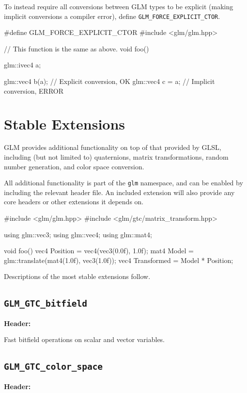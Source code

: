 \documentclass{scrartcl}
\numberwithin{figure}{subsection}
\begin{document}
To instead require all conversions between GLM types to be explicit (making implicit conversions a compiler error), define \verb|GLM_FORCE_EXPLICIT_CTOR|.

\begin{cppcode}
#define GLM_FORCE_EXPLICIT_CTOR
#include <glm/glm.hpp>

// This function is the same as above.
void foo()
{
  glm::ivec4 a;

  glm::vec4 b(a); // Explicit conversion, OK
  glm::vec4 c = a; // Implicit conversion, ERROR
}
\end{cppcode}

\section{Stable Extensions}

GLM provides additional functionality on top of that provided by GLSL, including (but not limited to) quaternions, matrix transformations, random number generation, and color space conversion.   

All additional functionality is part of the \verb|glm| namespace, and can be enabled by including the relevant header file.  An included extension will also provide any core headers or other extensions it depends on.

\begin{cppcode}
#include <glm/glm.hpp>
#include <glm/gtc/matrix_transform.hpp>

using glm::vec3;
using glm::vec4;
using glm::mat4;

void foo()
{
  vec4 Position = vec4(vec3(0.0f), 1.0f);
  mat4 Model = glm::translate(mat4(1.0f), vec3(1.0f));
  vec4 Transformed = Model * Position;
}
\end{cppcode}

Descriptions of the most stable extensions follow.

\subsection{\texttt{GLM\_GTC\_bitfield}}
\textbf{Header:} 

Fast bitfield operations on scalar and vector variables.

\subsection{\texttt{GLM\_GTC\_color\_space}}
\textbf{Header:} 
\end{document}
